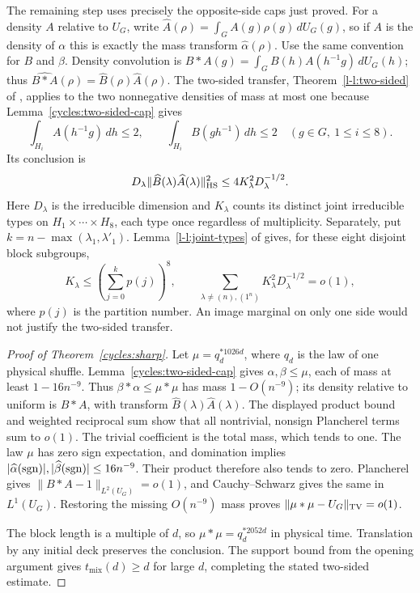 The remaining step uses precisely the opposite-side caps just proved.
For a density $A$ relative to $U_G$, write
$\widehat A(\rho)=\int_G A(g)\rho(g)\,dU_G(g)$, so if $A$ is the
density of $\alpha$ this is exactly the mass transform
$\widehat\alpha(\rho)$. Use the same convention for $B$ and $\beta$.
Density convolution is
$B*A(g)=\int_G B(h)A(h^{-1}g)\,dU_G(h)$; thus
$\widehat{B*A}(\rho)=\widehat B(\rho)\widehat A(\rho)$.
The two-sided transfer, Theorem~\ref*{l-l:two-sided} of
\cite{partialFourier}, applies to the two nonnegative densities of mass
at most one because Lemma~\ref{cycles:two-sided-cap} gives
\[
 \int_{H_i}A(h^{-1}g)\,dh\le2,\qquad
 \int_{H_i}B(gh^{-1})\,dh\le2
 \quad(g\in G,\ 1\le i\le8).
\]
Its conclusion is
\begin{equation}\label{cycles:two-sided-fourier-bound}
 D_\lambda\|\widehat B(\lambda)\widehat A(\lambda)\|_{\mathrm{HS}}^2
 \le4K_\lambda^2D_\lambda^{-1/2}.
\end{equation}
Here $D_\lambda$ is the irreducible dimension and $K_\lambda$ counts
its distinct joint irreducible types on $H_1\times\cdots\times H_8$,
each type once regardless of multiplicity. Separately, put
$k=n-\max(\lambda_1,\lambda'_1)$. Lemma~\ref*{l-l:joint-types} of
\cite{partialFourier} gives, for these eight disjoint block subgroups,
\[
 K_\lambda\le\left(\sum_{j=0}^k p(j)\right)^8,\qquad
 \sum_{\lambda\ne(n),(1^n)}K_\lambda^2D_\lambda^{-1/2}=o(1),
\]
where $p(j)$ is the partition number. An image marginal on only one
side would not justify the two-sided transfer.

\begin{proof}[Proof of Theorem~\ref{cycles:sharp}]
Let $\mu=q_d^{*1026d}$, where $q_d$ is the law of one physical shuffle.
Lemma~\ref{cycles:two-sided-cap} gives
$\alpha,\beta\le\mu$, each of mass at least $1-16n^{-9}$.
Thus $\beta*\alpha\le\mu*\mu$ has mass $1-O(n^{-9})$; its density
relative to uniform is $B*A$, with transform
$\widehat B(\lambda)\widehat A(\lambda)$.
The displayed product bound and weighted reciprocal sum show that all
nontrivial, nonsign Plancherel terms sum to $o(1)$. The trivial
coefficient is the total mass, which tends to one.
The law $\mu$ has zero sign expectation, and domination implies
$|\widehat\alpha(\operatorname{sgn})|,|\widehat\beta(\operatorname{sgn})|\le16n^{-9}$.
Their product therefore also tends to zero. Plancherel gives
$\|B*A-1\|_{L^2(U_G)}=o(1)$, and Cauchy--Schwarz gives the same
in $L^1(U_G)$. Restoring the missing $O(n^{-9})$ mass proves
$\|\mu*\mu-U_G\|_{\mathrm{TV}}=o(1)$.

The block length is a multiple of $d$, so
$\mu*\mu=q_d^{*2052d}$ in physical time. Translation by any initial
deck preserves the conclusion. The support bound from the opening
argument gives $t_{\mathrm{mix}}(d)\ge d$ for large $d$, completing
the stated two-sided estimate.
\end{proof}
